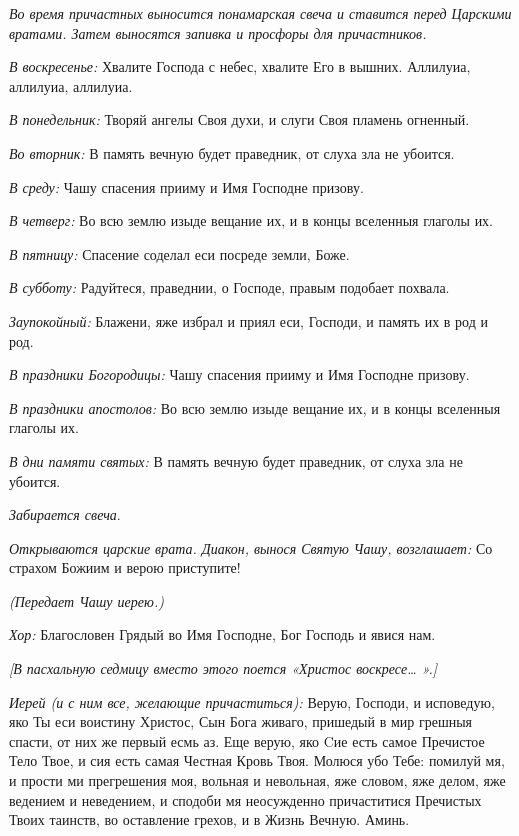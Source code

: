 \begin{mymulticols}


{\itshape Во время причастных выносится понамарская свеча и ставится перед Царскими вратами. Затем выносятся запивка и просфоры для причастников.}


 {\itshape В воскресенье:} Хвалите Господа с небес, хвалите Его в вышних. Аллилуиа, аллилуиа, аллилуиа. 


{\itshape В понедельник:} Творяй ангелы Своя духи, и слуги Своя пламень огненный. 


{\itshape Во вторник:} В память вечную будет праведник, от слуха зла не убоится. 


{\itshape В среду:} Чашу спасения прииму и Имя Господне призову. 


{\itshape В четверг:} Во всю землю изыде вещание их, и в концы вселенныя глаголы их. 

{\itshape В пятницу:} Спасение соделал еси посреде земли, Боже. 

{\itshape В субботу:} Радуйтеся, праведнии, о Господе, правым подобает похвала. 

{\itshape Заупокойный:} Блажени, яже избрал и приял еси, Господи, и память их в род и род. 

{\itshape В праздники Богородицы:} Чашу спасения прииму и Имя Господне призову. 

{\itshape В праздники апостолов:} Во всю землю изыде вещание их, и в концы вселенныя глаголы их. 


{\itshape В дни памяти святых:} В память вечную будет праведник, от слуха зла не убоится. 


 {\itshape  Забирается свеча}.
 
 {\itshape Открываются царские врата. Диакон, вынося Святую Чашу, возглашает:} Со страхом Божиим и верою приступите! 


{\itshape (Передает Чашу иерею.) }


{\itshape Хор:} Благословен Грядый во Имя Господне, Бог Господь и явися нам.


{\itshape [В пасхальную седмицу вместо этого поется «Христос воскресе… ».]}


 {\itshape Иерей (и с ним все, желающие причаститься):} Верую, Господи, и исповедую, яко Ты еси воистину Христос, Сын Бога живаго, пришедый в мир грешныя спасти, от них же первый есмь аз. Еще верую, яко Cие есть самое Пречистое Тело Твое, и сия есть самая Честная Кровь Твоя. Молюся убо Тебе: помилуй мя, и прости ми прегрешения моя, вольная и невольная, яже словом, яже делом, яже ведением и неведением, и сподоби мя неосужденно причаститися Пречистых Твоих таинств, во оставление грехов, и в Жизнь Вечную. Аминь.



\end{mymulticols}
